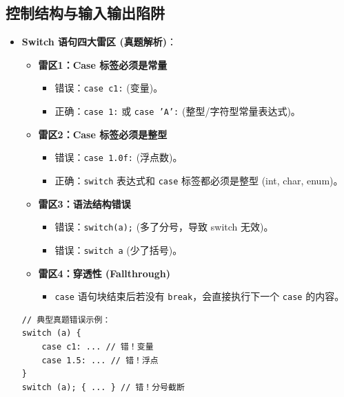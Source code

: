 \documentclass[a4paper,12pt]{article}
\begin{document}
\subsection{控制结构与输入输出陷阱}
\begin{itemize}
    \item \textbf{Switch 语句四大雷区 (真题解析)}：
    \begin{itemize}
        \item \textbf{雷区1：Case 标签必须是常量}
        \begin{itemize}
            \item 错误：\texttt{case c1:} (变量)。
            \item 正确：\texttt{case 1:} 或 \texttt{case 'A':} (整型/字符型常量表达式)。
        \end{itemize}
        \item \textbf{雷区2：Case 标签必须是整型}
        \begin{itemize}
            \item 错误：\texttt{case 1.0f:} (浮点数)。
            \item 正确：\texttt{switch} 表达式和 \texttt{case} 标签都必须是整型 (int, char, enum)。
        \end{itemize}
        \item \textbf{雷区3：语法结构错误}
        \begin{itemize}
            \item 错误：\texttt{switch(a);} (多了分号，导致 switch 无效)。
            \item 错误：\texttt{switch a} (少了括号)。
        \end{itemize}
        \item \textbf{雷区4：穿透性 (Fallthrough)}
        \begin{itemize}
            \item \texttt{case} 语句块结束后若没有 \texttt{break}，会直接执行下一个 \texttt{case} 的内容。
        \end{itemize}
    \end{itemize}
    \begin{lstlisting}
// 典型真题错误示例：
switch (a) {
    case c1: ... // 错！变量
    case 1.5: ... // 错！浮点
}
switch (a); { ... } // 错！分号截断
    \end{lstlisting}


\end{itemize}
\end{document}
